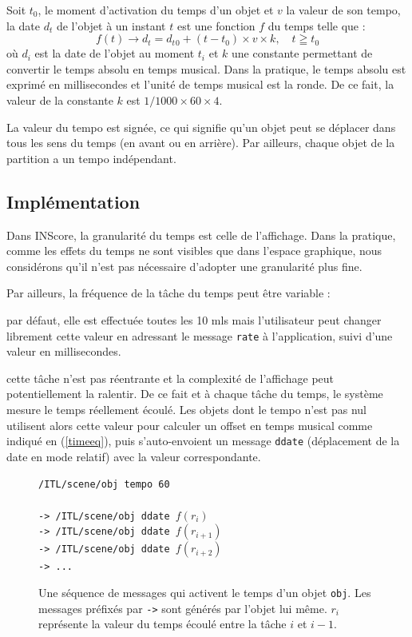 \documentclass{article}
\newcommand{\OSC}[1]	{{\fontsize{9pt}{9pt} \selectfont\texttt{#1}}}
\let\olditemize\itemize
\let\oldenditemize\enditemize
\renewenvironment{itemize} 	{\olditemize \renewcommand{\labelitemi}{$\bullet$} \setlength{\itemsep}{0mm}}{\oldenditemize}
\newcommand{\sample}[1]		{\vspace{-0.2em}\begin{center}\colorbox{mygrey}{\begin{minipage}[t]{0.98\columnwidth} {\small \texttt{#1}}\end{minipage}}\end{center}}
\begin{document}
Soit $t_0$, le moment d'activation du temps d'un objet et $v$ la valeur de son tempo, la date $d_t$ de l'objet à un instant $t$ est une fonction $f$ du temps telle que :
\begin{equation}
	 f(t) \to d_t = d_t{_0} + (t - t_0) \times v \times k , \quad t \geqq t_0
\label{timeeq}
\end{equation}
où $d_i$ est la date de l'objet au moment $t_i$ et $k$ une constante permettant de convertir le temps absolu en temps musical. Dans la pratique, le temps absolu est exprimé en millisecondes et l'unité de temps musical est la ronde. De ce fait, la valeur de la constante $k$ est $1 / 1000 \times 60 \times 4$.

La valeur du tempo est signée, ce qui signifie qu'un objet peut se déplacer dans tous les sens du temps (en avant ou en arrière).
Par ailleurs, chaque objet de la partition a un tempo indépendant.

\subsection{Implémentation}

Dans INScore, la granularité du temps est celle de l'affichage. Dans la pratique, comme les effets du temps ne sont visibles que dans l'espace graphique, nous considérons qu'il n'est pas nécessaire d'adopter une granularité plus fine. 

Par ailleurs, la fréquence de la tâche du temps peut être variable : 
\begin{itemize}
\item par défaut, elle est effectuée toutes les 10 mls mais l'utilisateur peut changer librement cette valeur en adressant le message \OSC{rate} à l'application, suivi d'une valeur en millisecondes.
\item cette tâche n'est pas réentrante et la complexité de l'affichage peut potentiellement la ralentir.
\end{itemize}
De ce fait et à chaque tâche du temps, le système mesure le temps réellement écoulé. Les objets dont le tempo n'est pas nul utilisent alors cette valeur pour calculer un offset en temps musical comme indiqué en (\ref{timeeq}), puis s'auto-envoient un message \OSC{ddate} (déplacement de la date en mode relatif) avec la valeur correspondante.

\begin{figure}[h]
   \centering
   \sample{/ITL/scene/obj tempo 60 \\
   \\
-> /ITL/scene/obj ddate $f(r_i)$ \\
-> /ITL/scene/obj ddate $f(r_{i+1})$ \\
-> /ITL/scene/obj ddate $f(r_{i+2})$ \\
-> ...
}
   \caption{Une séquence de messages qui activent le temps d'un objet \OSC{obj}. Les messages préfixés par \OSC{->} sont générés par l'objet lui même. $r_{i}$ représente la valeur du temps écoulé entre la tâche $i$ et $i-1$.}
   \label{fig:tempo}
\end{figure}
\end{document}
